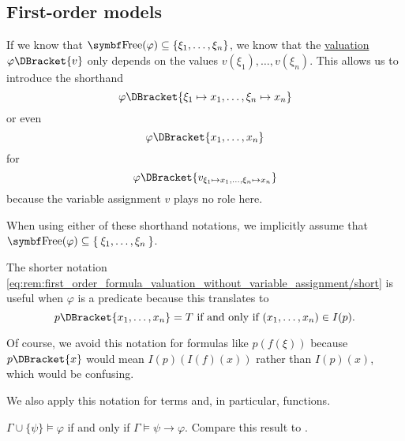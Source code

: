 \subsection{First-order models}\label{subsec:first_order_models}

\begin{remark}\label{rem:first_order_formula_valuation_without_variable_assignment}
  If we know that \( \Bold{Free}(\varphi) \subseteq \{ \xi_1, \ldots, \xi_n \} \), we know that the \hyperref[def:first_order_valuation/formula_valuation]{valuation} \( \varphi\DBracket{v} \) only depends on the values \( v(\xi_1), \ldots, v(\xi_n) \). This allows us to introduce the shorthand
  \begin{equation}\label{eq:rem:first_order_formula_valuation_without_variable_assignment/long}
    \varphi\DBracket{\xi_1 \mapsto x_1, \ldots, \xi_n \mapsto x_n}
  \end{equation}
  or even
  \begin{equation}\label{eq:rem:first_order_formula_valuation_without_variable_assignment/short}
    \varphi\DBracket{x_1, \ldots, x_n}
  \end{equation}
  for
  \begin{equation*}
    \varphi\DBracket{v_{\xi_1 \mapsto x_1, \ldots, \xi_n \mapsto x_n}}
  \end{equation*}
  because the variable assignment \( v \) plays no role here.

  When using either of these shorthand notations, we implicitly assume that \( \Bold{Free}(\varphi) \subseteq \Set{ \xi_1, \ldots, \xi_n } \).

  The shorter notation \eqref{eq:rem:first_order_formula_valuation_without_variable_assignment/short} is useful when \( \varphi \) is a predicate because this translates to
  \begin{equation*}
    p\DBracket{x_1, \ldots, x_n} = T \T{if and only if} (x_1, \ldots, x_n) \in I(p).
  \end{equation*}

  Of course, we avoid this notation for formulas like \( p(f(\xi)) \) because \( p\DBracket{x} \) would mean \( I(p)(I(f)(x)) \) rather than \( I(p)(x) \), which would be confusing.

  We also apply this notation for terms and, in particular, functions.
\end{remark}

\begin{theorem}\label{thm:semantic_deduction_theorem}
  \( \Gamma \cup \{ \psi \} \vDash \varphi \) if and only if \( \Gamma \vDash \psi \rightarrow \varphi \). Compare this result to .
\end{theorem}

